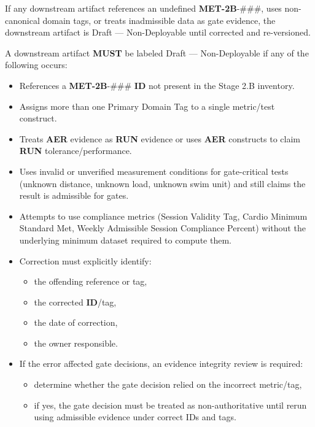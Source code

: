 \documentclass[10pt]{article}
\begin{document}
If any downstream artifact references an undefined \textbf{MET-2B}-\#\#\#, uses non-canonical domain tags, or treats inadmissible data as gate evidence, the downstream artifact is Draft — Non-Deployable until corrected and re-versioned.

A downstream artifact \textbf{MUST} be labeled Draft — Non-Deployable if any of the following occurs:

\begin{itemize}
\item References a \textbf{MET-2B}-\#\#\# \textbf{ID} not present in the Stage 2.B inventory.
\item Assigns more than one Primary Domain Tag to a single metric/test construct.
\item Treats \textbf{AER} evidence as \textbf{RUN} evidence or uses \textbf{AER} constructs to claim \textbf{RUN} tolerance/performance.
\item Uses invalid or unverified measurement conditions for gate-critical tests (unknown distance, unknown load, unknown swim unit) and still claims the result is admissible for gates.
\item Attempts to use compliance metrics (Session Validity Tag, Cardio Minimum Standard Met, Weekly Admissible Session Compliance Percent) without the underlying minimum dataset required to compute them.
\end{itemize}

\begin{itemize}
\item Correction must explicitly identify:
  \begin{itemize}
  \item the offending reference or tag,
  \item the corrected \textbf{ID}/tag,
  \item the date of correction,
  \item the owner responsible.
  \end{itemize}
\item If the error affected gate decisions, an evidence integrity review is required:
  \begin{itemize}
  \item determine whether the gate decision relied on the incorrect metric/tag,
  \item if yes, the gate decision must be treated as non-authoritative until rerun using admissible evidence under correct IDs and tags.
  \end{itemize}
\end{itemize}
\end{document}
